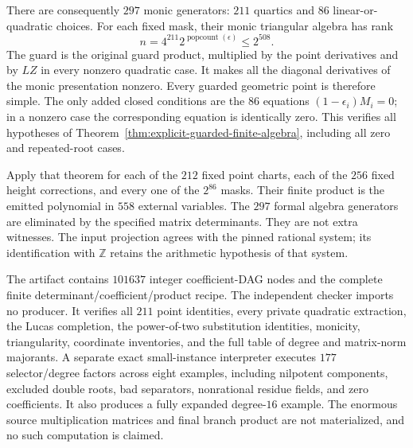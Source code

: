 There are consequently $297$ monic generators: $211$ quartics
and $86$ linear-or-quadratic choices. For each fixed mask, their
monic triangular algebra has rank
\[
 n=4^{211}2^{\operatorname{popcount}(\epsilon)}\le2^{508}.
\]
The guard is the original guard product, multiplied by the point
derivatives and by $LZ$ in every nonzero quadratic case. It makes
all the diagonal derivatives of the monic presentation nonzero.
Every guarded geometric point is therefore simple. The only added
closed conditions are the $86$ equations
$(1-\epsilon_i)M_i=0$; in a nonzero case the corresponding equation
is identically zero. This verifies all hypotheses of
Theorem~\ref{thm:explicit-guarded-finite-algebra}, including all
zero and repeated-root cases.

Apply that theorem for each of the $212$ fixed point charts, each
of the $256$ fixed height corrections, and every one of the
$2^{86}$ masks. Their finite product is the emitted polynomial
in $558$ external variables. The $297$ formal algebra generators
are eliminated by the specified matrix determinants. They are not
extra witnesses. The input projection agrees with the pinned
rational system; its identification with $\mathbb Z$ retains the
arithmetic hypothesis of that system.

The artifact contains $101637$ integer coefficient-DAG nodes and
the complete finite determinant/coefficient/product recipe. The
independent checker imports no producer. It verifies all $211$
point identities, every private quadratic extraction, the Lucas
completion, the power-of-two substitution identities, monicity,
triangularity, coordinate inventories, and the full table of
degree and matrix-norm majorants. A separate exact small-instance
interpreter executes $177$ selector/degree factors across eight
examples, including nilpotent components, excluded double roots,
bad separators, nonrational residue fields, and zero coefficients.
It also produces a fully expanded degree-$16$ example. The enormous
source multiplication matrices and final branch product are not
materialized, and no such computation is claimed.
